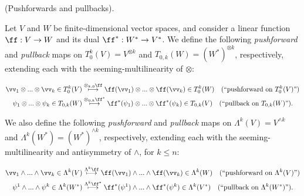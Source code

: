 \begin{defn}
\label{ch::exterior_pwrs::defn::pushforward_on_Tk0}
    (Pushforwards and pullbacks).
    
    Let $V$ and $W$ be finite-dimensional vector spaces, and consider a linear function $\ff:V \rightarrow W$ and its dual $\ff^*:W^* \rightarrow V^*$. We define the following \textit{pushforward} and \textit{pullback} maps on $T^k_0(V) = V^{\otimes k}$ and $T_{0,k}(W) = (W^*)^{\otimes k}$, respectively, extending each with the seeming-multilinearity of $\otimes$:
    
    \begin{align*}
        \vv_1 \otimes ... \otimes \vv_k \in T^k_0(V) &\overset{\otimes_{k, 0} \ff}{\longmapsto} \ff(\vv_1) \otimes ... \otimes \ff(\vv_k) \in T^k_0(W) \quad \text{(``pushforward on $T^k_0(V)$'')} \\
        \psi_1 \otimes ... \otimes \psi_k \in T_{0,k}(W) &\overset{\otimes_{0, k} \ff^*}{\longmapsto} \ff^*(\psi_1) \otimes ... \otimes \ff^*(\psi_k) \in T_{0,k}(V) \quad \text{(``pullback on $T_{0,k}(W)$'')}.
    \end{align*}
    
    We also define the following \textit{pushforward} and \textit{pullback} maps on $\Lambda^k(V) = V^{\wedge k}$ and $\Lambda^k(W^*) = (W^*)^{\wedge k}$, respectively, extending each with the seeming-multilinearity and antisymmetry of $\wedge$, for $k \leq n$:
    
    \begin{align*}
        \vv_1 \wedge ... \wedge \vv_k \in \Lambda^k(V) &\overset{\Lambda^k \ff}{\longmapsto} \ff(\vv_1) \wedge ... \wedge \ff(\vv_k) \in \Lambda^k(W) \quad \text{(``pushforward on $\Lambda^k(V)$'')} \\
        \psi^1 \wedge ... \wedge \psi^k \in \Lambda^k(W^*) &\overset{\Lambda^k \ff^*}{\longmapsto} \ff^*(\psi^1) \wedge ... \wedge \ff^*(\psi^k) \in \Lambda^k(V^*) \quad \text{(``pullback on $\Lambda^k(W^*)$'')}.
    \end{align*}
\end{defn}

